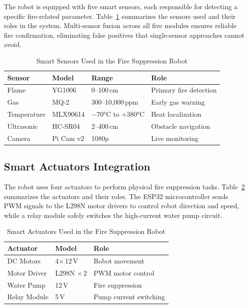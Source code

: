 \documentclass[conference]{IEEEtran}
\begin{document}
The robot is equipped with five smart sensors, each 
responsible for detecting a specific fire-related parameter. 
Table~\ref{tab:sensors} summarizes the sensors used and 
their roles in the system. Multi-sensor fusion across all 
five modules ensures reliable fire confirmation, eliminating 
false positives that single-sensor approaches cannot avoid.

\begin{table}[h]
\centering
\caption{Smart Sensors Used in the Fire Suppression Robot}
\label{tab:sensors}
\begin{tabular}{|l|l|l|l|}
\hline
\textbf{Sensor} & \textbf{Model} & \textbf{Range} & \textbf{Role} \\
\hline
Flame      & YG1006     & 0--100\,cm          & Primary fire detection \\
Gas        & MQ-2       & 300--10{,}000\,ppm  & Early gas warning      \\
Temperature & MLX90614  & $-$70°C to +380°C   & Heat localization      \\
Ultrasonic & HC-SR04    & 2--400\,cm          & Obstacle navigation    \\
Camera     & Pi Cam v2  & 1080p               & Live monitoring        \\
\hline
\end{tabular}
\end{table}

\subsection{Smart Actuators Integration}

The robot uses four actuators to perform physical fire 
suppression tasks. Table~\ref{tab:actuators} summarizes the 
actuators and their roles. The ESP32 microcontroller sends 
PWM signals to the L298N motor drivers to control robot 
direction and speed, while a relay module safely switches 
the high-current water pump circuit.

\begin{table}[h]
\centering
\caption{Smart Actuators Used in the Fire Suppression Robot}
\label{tab:actuators}
\begin{tabular}{|l|l|l|}
\hline
\textbf{Actuator}  & \textbf{Model}  & \textbf{Role}           \\
\hline
DC Motors      & 4$\times$\,12\,V  & Robot movement          \\
Motor Driver   & L298N $\times$\,2 & PWM motor control       \\
Water Pump     & 12\,V             & Fire suppression        \\
Relay Module   & 5\,V              & Pump current switching  \\
\hline
\end{tabular}
\end{table}
\end{document}
